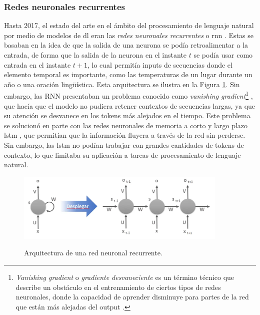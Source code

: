 \subsubsection{Redes neuronales recurrentes}
Hasta 2017, el estado del arte en el ámbito del procesamiento de lenguaje natural por medio de modelos de \gls{dl} eran las \emph{redes neuronales recurrentes} o \gls{rnn} \citep{schmidtRecurrentNeuralNetworks2019}. Estas se basaban en la idea de que la salida de una neurona se podía retroalimentar a la entrada, de forma que la salida de la neurona en el instante $t$ se podía usar como entrada en el instante $t+1$, lo cual permitía inputs de secuencias donde el elemento temporal es importante, como las temperaturas de un lugar durante un año o una oración lingüística. Esta arquitectura se ilustra en la Figura \ref{fig:red_neuronal_recurrente}. Sin embargo, las RNN presentaban un problema conocido como \emph{vanishing gradient}\footnote{\emph{Vanishing gradient} o \emph{gradiente desvaneciente} es un término técnico que describe un obstáculo en el entrenamiento de ciertos tipos de redes neuronales, donde la capacidad de aprender disminuye para partes de la red que están más alejadas del output \citep{VanishingGradientWikipedia}.} \citep{pascanuDifficultyTrainingRecurrent2013}, que hacía que el modelo no pudiera retener contextos de secuencias largas, ya que su atención se desvanece en los tokens más alejados en el tiempo. Este problema se solucionó en parte con las redes neuronales de memoria a corto y largo plazo \gls{lstm} \citep{HochreiterVanishingGradient1998}, que permitían que la información fluyera a través de la red sin perderse. Sin embargo, las \gls{lstm} no podían trabajar con grandes cantidades de tokens de contexto, lo que limitaba su aplicación a tareas de procesamiento de lenguaje natural.

\begin{figure}[H]
    \caption[Arquitectura de una red neuronal recurrente]{Arquitectura de una red neuronal recurrente.}
    \centering
    \includegraphics[width=0.9\textwidth]{./figuras/red_neuronal_recurrente.png}
    \label{fig:red_neuronal_recurrente}
\end{figure}


